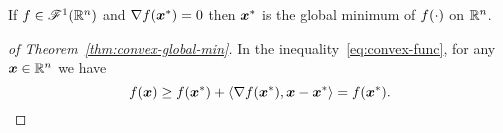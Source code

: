 \begin{thm}\label{thm:convex-global-min}
    If \(f \in \mathscr{F}^1(\mathbb{R}^n)\) and \(\nabla f(\bm{x}^*) = 0\) then \(\bm{x}^*\) is the global minimum
    of \(f(\cdot)\) on \(\mathbb{R}^n\).
\end{thm}

\begin{proof}[of Theorem~\ref{thm:convex-global-min}]
    In the inequality~\ref{eq:convex-func}, for any \(\bm{x} \in \mathbb{R}^n\) we have
    \[
        f(\bm{x}) \ge f(\bm{x}^*) + \left\langle \nabla f(\bm{x}^*), \bm{x} - \bm{x}^* \right\rangle = f(\bm{x}^*).  
    \]
\end{proof}